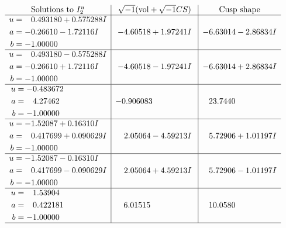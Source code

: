 \documentclass[1p]{elsarticle_modified}
\theoremstyle{definition}
\newcommand{\I}{\sqrt{-1}}
\begin{document}
$$\begin{array}{c|c|c}  
\text{Solutions to }I^u_{2}& \I (\text{vol} + \sqrt{-1}CS) & \text{Cusp shape}\\
 \hline 
\begin{aligned}
u &= \phantom{-}0.493180 + 0.575288 I \\
a &= -0.26610 - 1.72116 I \\
b &= -1.00000\phantom{ +0.000000I}\end{aligned}
 & -4.60518 + 1.97241 I & -6.63014 - 2.86834 I \\ \hline\begin{aligned}
u &= \phantom{-}0.493180 - 0.575288 I \\
a &= -0.26610 + 1.72116 I \\
b &= -1.00000\phantom{ +0.000000I}\end{aligned}
 & -4.60518 - 1.97241 I & -6.63014 + 2.86834 I \\ \hline\begin{aligned}
u &= -0.483672\phantom{ +0.000000I} \\
a &= \phantom{-}4.27462\phantom{ +0.000000I} \\
b &= -1.00000\phantom{ +0.000000I}\end{aligned}
 & -0.906083\phantom{ +0.000000I} & \phantom{-}23.7440\phantom{ +0.000000I} \\ \hline\begin{aligned}
u &= -1.52087 + 0.16310 I \\
a &= \phantom{-}0.417699 + 0.090629 I \\
b &= -1.00000\phantom{ +0.000000I}\end{aligned}
 & \phantom{-}2.05064 - 4.59213 I & \phantom{-}5.72906 + 1.01197 I \\ \hline\begin{aligned}
u &= -1.52087 - 0.16310 I \\
a &= \phantom{-}0.417699 - 0.090629 I \\
b &= -1.00000\phantom{ +0.000000I}\end{aligned}
 & \phantom{-}2.05064 + 4.59213 I & \phantom{-}5.72906 - 1.01197 I \\ \hline\begin{aligned}
u &= \phantom{-}1.53904\phantom{ +0.000000I} \\
a &= \phantom{-}0.422181\phantom{ +0.000000I} \\
b &= -1.00000\phantom{ +0.000000I}\end{aligned}
 & \phantom{-}6.01515\phantom{ +0.000000I} & \phantom{-}10.0580\phantom{ +0.000000I}\\
 \hline 
 \end{array}$$\newpage\newpage\renewcommand{\arraystretch}{1}
\end{document}
